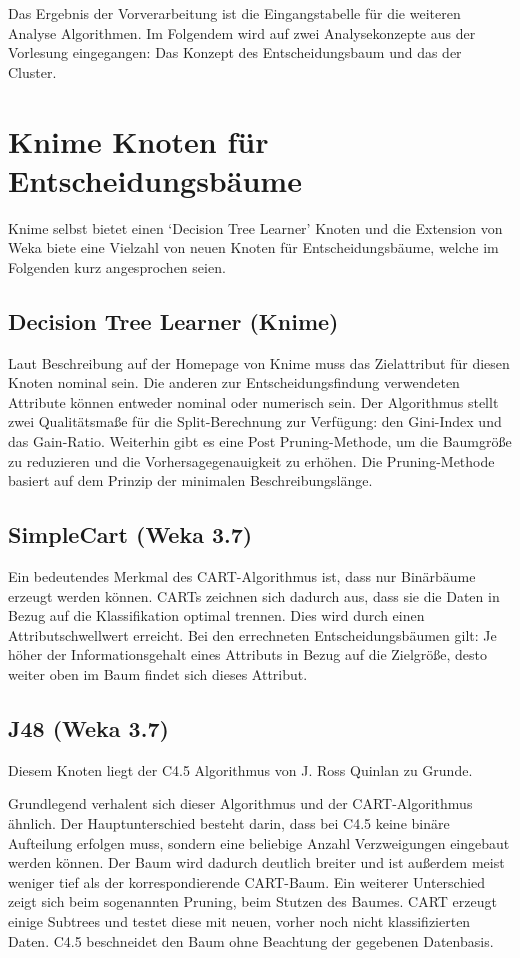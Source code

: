 \documentclass[12pt,					%
							 oneside,			%
							 a4paper,			%
							 halfparskip,		%
							 liststotoc,			%
							 bibtotoc,			%
							 fleqn,				%
							 pointlessnumbers]	%
							 {scrreprt}
\begin{document}
	Das Ergebnis der Vorverarbeitung ist die Eingangstabelle für die weiteren Analyse Algorithmen. Im Folgendem wird auf zwei Analysekonzepte aus der Vorlesung eingegangen: Das Konzept des Entscheidungsbaum und das der Cluster.
	
	\section{Knime Knoten für Entscheidungsbäume}\label{tree:dec:nodes}
		Knime selbst bietet einen `Decision Tree Learner' Knoten und die Extension von Weka biete eine Vielzahl von neuen Knoten für Entscheidungsbäume, welche im Folgenden kurz angesprochen seien.
	
		\subsection{Decision Tree Learner (Knime)}
			Laut Beschreibung auf der Homepage von Knime muss das Zielattribut für diesen Knoten nominal sein. Die anderen zur Entscheidungsfindung verwendeten Attribute können entweder nominal oder numerisch sein. Der Algorithmus stellt zwei Qualitätsmaße für die Split-Berechnung zur Verfügung: den Gini-Index und das Gain-Ratio. Weiterhin gibt es eine Post Pruning-Methode, um die Baumgröße zu reduzieren und die Vorhersagegenauigkeit zu erhöhen. Die Pruning-Methode basiert auf dem Prinzip der minimalen Beschreibungslänge.\cite{DecTreeLearner}
		
		\subsection{SimpleCart (Weka 3.7)}
			Ein bedeutendes Merkmal des CART-Algorithmus ist, dass nur Binärbäume erzeugt werden können. CARTs zeichnen sich dadurch aus, dass sie die Daten in Bezug auf die Klassifikation optimal trennen. Dies wird durch einen Attributschwellwert erreicht. Bei den errechneten Entscheidungsbäumen gilt: Je höher der Informationsgehalt eines Attributs in Bezug auf die Zielgröße, desto weiter oben im Baum findet sich dieses Attribut.\cite{Breiman1983}
			
			
		\subsection{J48 (Weka 3.7)}
			Diesem Knoten liegt der C4.5 Algorithmus von J. Ross Quinlan zu Grunde.
			
			Grundlegend verhalent sich dieser Algorithmus und der CART-Algorithmus ähnlich. Der Hauptunterschied besteht darin, dass bei C4.5 keine binäre Aufteilung erfolgen muss, sondern eine beliebige Anzahl Verzweigungen eingebaut werden können. Der Baum wird dadurch deutlich breiter und ist außerdem meist weniger tief als der korrespondierende CART-Baum. Ein weiterer Unterschied zeigt sich beim sogenannten Pruning, beim Stutzen des Baumes. CART erzeugt einige Subtrees und testet diese mit neuen, vorher noch nicht klassifizierten Daten. C4.5 beschneidet den Baum ohne Beachtung der gegebenen Datenbasis.\cite{Salzberg1994}
			
\end{document}
